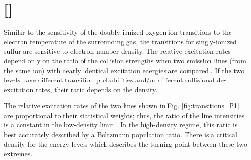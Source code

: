 \section{[]}

Similar to the sensitivity of the doubly-ionized oxygen ion transitions to the 
electron temperature of the surrounding gas, the transitions for singly-ionized 
sulfur are sensitive to electron number density.  The relative excitation rates 
depend only on the ratio of the collision strengths when two emission lines 
(from the same ion) with nearly identical excitation energies are compared 
\citep{Osterbrock89}.  If the two levels have different transition probabilities 
and/or different collisional de-excitation rates, their ratio depends on the 
density.

The relative excitation rates of the two lines shown in Fig. 
\ref{fig:transitions_P1} are proportional to their statistical weights; thus, the 
ratio of the line intensities is a constant in the low-density limit 
\citep{Osterbrock89}.  In the high-density regime, this ratio is best accurately 
described by a Boltzmann population ratio.  There is a critical density for the 
energy levels which describes the turning point between these two extremes.